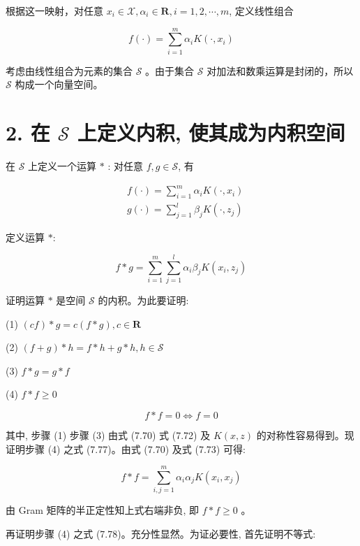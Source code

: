 \documentclass[10pt]{article}
\begin{document}
根据这一映射，对任意 $x_{i} \in \mathcal{X}, \alpha_{i} \in \boldsymbol{R}, i=1,2, \cdots, m$, 定义线性组合


\begin{equation*}
f(\cdot)=\sum_{i=1}^{m} \alpha_{i} K\left(\cdot, x_{i}\right) \tag{7.70}
\end{equation*}


考虑由线性组合为元素的集合 $\mathcal{S}$ 。由于集合 $\mathcal{S}$ 对加法和数乘运算是封闭的，所以 $\mathcal{S}$ 构成一个向量空间。

\section*{2. 在 $\mathcal{S}$ 上定义内积, 使其成为内积空间}
在 $\mathcal{S}$ 上定义一个运算 $*$ : 对任意 $f, g \in \mathcal{S}$, 有


\begin{align*}
& f(\cdot)=\sum_{i=1}^{m} \alpha_{i} K\left(\cdot, x_{i}\right)  \tag{7.71}\\
& g(\cdot)=\sum_{j=1}^{l} \beta_{j} K\left(\cdot, z_{j}\right) \tag{7.72}
\end{align*}


定义运算 $*:$


\begin{equation*}
f * g=\sum_{i=1}^{m} \sum_{j=1}^{l} \alpha_{i} \beta_{j} K\left(x_{i}, z_{j}\right) \tag{7.73}
\end{equation*}


证明运算 $*$ 是空间 $\mathcal{S}$ 的内积。为此要证明:

(1) $(c f) * g=c(f * g), c \in \boldsymbol{R}$

(2) $(f+g) * h=f * h+g * h, h \in \mathcal{S}$

(3) $f * g=g * f$

(4) $f * f \geqslant 0$


\begin{equation*}
f * f=0 \Leftrightarrow f=0 \tag{7.77}
\end{equation*}


其中, 步骤 (1) 步骤 (3) 由式 (7.70) 式 (7.72) 及 $K(x, z)$ 的对称性容易得到。现证明步骤 (4) 之式 (7.77)。由式 (7.70) 及式 (7.73) 可得:

$$
f * f=\sum_{i, j=1}^{m} \alpha_{i} \alpha_{j} K\left(x_{i}, x_{j}\right)
$$

由 Gram 矩阵的半正定性知上式右端非负, 即 $f * f \geqslant 0$ 。

再证明步骤 (4) 之式 (7.78)。充分性显然。为证必要性, 首先证明不等式:
\end{document}
